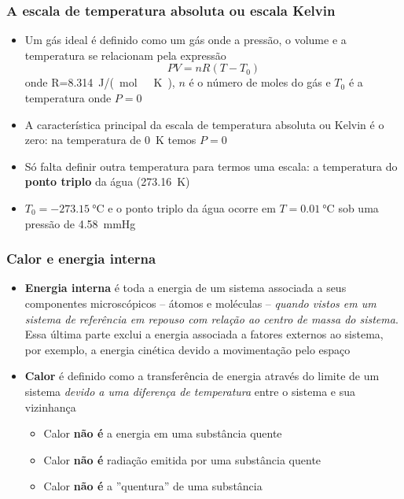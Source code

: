 \begin{frame}
    \frametitle{A escala de temperatura absoluta ou  escala Kelvin}

    \begin{itemize}
        \item Um gás ideal é definido como um gás onde a pressão, o volume e a temperatura se relacionam pela expressão
            \[
                PV=nR(T-T_0)
            \]
            onde R=\SI{8.314}{J/(mol\ K)}, \(n\) é o número de moles do gás e \(T_0\) é a temperatura onde \(P=0\)

        \item A característica principal da escala de temperatura absoluta ou
            Kelvin é o zero: na temperatura de \SI{0}{K} temos $P=0$

        \item Só falta definir outra temperatura para termos uma escala: a
            temperatura do \textbf{ponto triplo} da água (\SI{273.16}{K})

        \item \(T_0 = \SI{-273.15}{\celsius}\) e o ponto triplo da água ocorre
            em \(T=\SI{0.01}{\celsius}\) sob uma pressão de \SI{4.58}{mmHg}

    \end{itemize}
\end{frame}


\begin{frame}
    \frametitle{Calor e energia interna}
    \begin{itemize}
        \item \textbf{Energia interna} é toda a energia de um sistema associada a seus
            componentes microscópicos -- átomos e moléculas -- \textit{quando vistos em
                um sistema de referência em repouso com relação ao centro de massa do
            sistema}. Essa última parte exclui a energia associada a fatores externos ao
            sistema, por exemplo, a energia cinética devido a movimentação pelo espaço

        \item \textbf{Calor} é definido como a transferência de energia através do
            limite de um sistema \textit{devido a uma diferença de temperatura} entre o
            sistema e sua vizinhança

            \begin{itemize}
                \item Calor \textbf{não é} a energia em uma substância quente
                \item Calor \textbf{não é} radiação emitida por uma substância quente
                \item Calor \textbf{não é} a ''quentura'' de uma substância
            \end{itemize}
    \end{itemize}
\end{frame}

